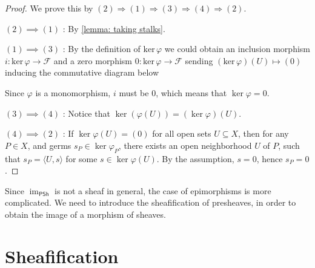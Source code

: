 \documentclass[11pt]{article}
\newcommand{\im}{\operatorname{im}}
\begin{document}
\begin{proof}
    We prove this by $(2) \Longrightarrow (1) \Longrightarrow (3) \Longrightarrow (4) \Longrightarrow (2)$. 

    $ (2) \implies (1) $ : By \ref{lemma: taking stalks}. 

    $ (1) \implies (3)$ : By the definition of $\mathrm{ker}\,\varphi$ 
    we could obtain an inclusion morphism 
    $i : \mathrm{ker}\,\varphi \to \mathscr{F}$ 
    and a zero morphism $0:\mathrm{ker}\,\varphi \to \mathscr{F}$ 
    sending $(\mathrm{ker}\,\varphi)(U) \mapsto (0)$ 
    inducing the commutative diagram below 
    \begin{center}
    \end{center}
    Since $ \varphi $ is a monomorphism, $ i $ must be $ 0 $, 
    which means that $ \ker \varphi = 0 $. 

    $ (3) \implies (4) $ : 
    Notice that $ \ker (\varphi(U))= (\ker \varphi)(U) $. 

    $ (4) \implies (2) $ :
    If $ \ker \varphi(U) = (0) $ for all open sets $ U \subseteq X $, 
    then for any $ P \in X $, and germs $ s_{P} \in \ker \varphi_{P} $, 
    there exists an open neighborhood $ U $ of $ P $, 
    such that $ s_{P} = \langle U, s \rangle $ for some $ s \in \ker \varphi(U) $. 
    By the assumption, $ s = 0 $, hence $ s_{P} = 0 $. 

\end{proof}

Since $ \im_{\mathsf{PSh}} $ is not a sheaf in general, 
the case of epimorphisms is more complicated. 
We need to introduce the sheafification of presheaves, 
in order to obtain the image of a morphism of sheaves. 

\section{Sheafification}
\end{document}
